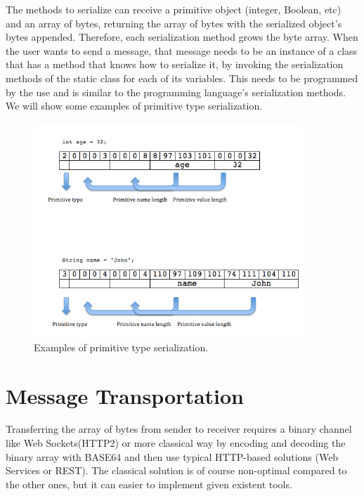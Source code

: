 The methods to serialize can receive a primitive object (integer, Boolean, etc) and an array of bytes, returning the array
of bytes with the serialized object’s bytes appended. Therefore, each serialization method grows the byte array. When the
user wants to send a message, that message needs to be an instance of a class that has a method that knows how to serialize it,
by invoking the serialization methods of the static class for each of its variables. This needs to be programmed by the use and
is similar to the programming language’s serialization methods.\\

We will show some examples of primitive type serialization.

\begin{figure}[!htb]
  \centering
  \includegraphics[width=0.9\textwidth]{Figures/binary.png}
  \caption[Examples of primitive type serialization.]{Examples of primitive type serialization.}
  \label{fig:examplebinary}
\end{figure}



\section{Message Transportation}
\label{section:messageTransfer}

Transferring the array of bytes from sender to receiver requires a binary channel like Web Sockets(HTTP2) or
more classical way by encoding and decoding the binary array with BASE64 and then use typical HTTP-based
solutions (Web Services or REST). The classical solution is of course non-optimal compared to the other ones,
but it can easier to implement given existent tools.\\

